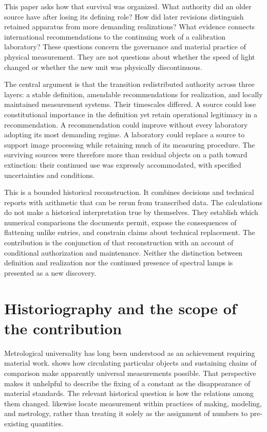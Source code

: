 \documentclass[11pt,a4paper]{article}
\begin{document}
This paper asks how that survival was organized. What authority did an older source have after losing its defining role? How did later revisions distinguish retained apparatus from more demanding realizations? What evidence connects international recommendations to the continuing work of a calibration laboratory? These questions concern the governance and material practice of physical measurement. They are not questions about whether the speed of light changed or whether the new unit was physically discontinuous.

The central argument is that the transition redistributed authority across three layers: a stable definition, amendable recommendations for realization, and locally maintained measurement systems. Their timescales differed. A source could lose constitutional importance in the definition yet retain operational legitimacy in a recommendation. A recommendation could improve without every laboratory adopting its most demanding regime. A laboratory could replace a source to support image processing while retaining much of its measuring procedure. The surviving sources were therefore more than residual objects on a path toward extinction: their continued use was expressly accommodated, with specified uncertainties and conditions.

This is a bounded historical reconstruction. It combines decisions and technical reports with arithmetic that can be rerun from transcribed data. The calculations do not make a historical interpretation true by themselves. They establish which numerical comparisons the documents permit, expose the consequences of flattening unlike entries, and constrain claims about technical replacement. The contribution is the conjunction of that reconstruction with an account of conditional authorization and maintenance. Neither the distinction between definition and realization nor the continued presence of spectral lamps is presented as a new discovery.

\section{Historiography and the scope of the contribution}
Metrological universality has long been understood as an achievement requiring material work. \citet{oconnell1993} shows how circulating particular objects and sustaining chains of comparison make apparently universal measurements possible. That perspective makes it unhelpful to describe the fixing of a constant as the disappearance of material standards. The relevant historical question is how the relations among them changed. \citet{mitchell2017} likewise locate measurement within practices of making, modeling, and metrology, rather than treating it solely as the assignment of numbers to pre-existing quantities.
\end{document}

